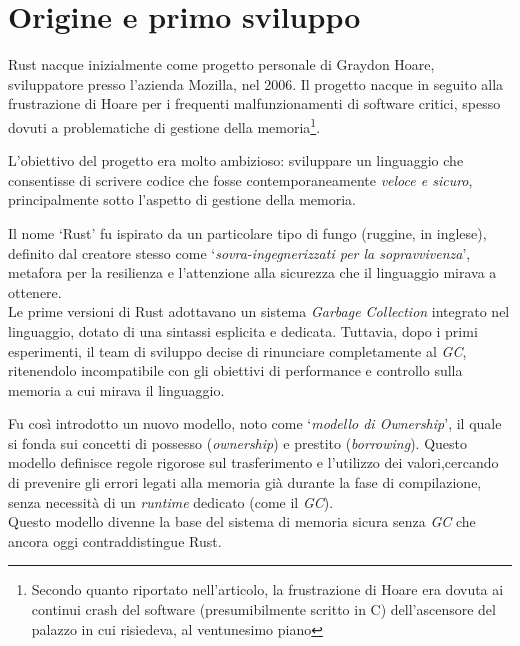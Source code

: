 \section{Origine e primo sviluppo}
Rust nacque inizialmente come progetto personale di Graydon Hoare, sviluppatore presso l'azienda Mozilla, nel 2006.
Il progetto nacque in seguito alla frustrazione di Hoare per i frequenti malfunzionamenti di software critici, spesso dovuti 
a problematiche di gestione della memoria\footnote{Secondo quanto riportato nell'articolo\cite{rust-2023-interview}, 
la frustrazione di Hoare era dovuta ai continui crash del software (presumibilmente scritto in C) dell'ascensore del palazzo in cui risiedeva, al ventunesimo piano}.

L'obiettivo del progetto era molto ambizioso: sviluppare un linguaggio che consentisse di scrivere codice 
che fosse contemporaneamente \textit{veloce e sicuro}, principalmente sotto l'aspetto di gestione della memoria.

Il nome `Rust' fu ispirato da un particolare tipo di fungo (ruggine, in inglese), definito dal creatore 
stesso come `\textit{sovra-ingegnerizzati per la sopravvivenza}', metafora per la resilienza e l'attenzione 
alla sicurezza che il linguaggio mirava a ottenere. \hfill
\vspace{10pt}\\
\noindent Le prime versioni di Rust adottavano un sistema \textit{Garbage Collection} integrato nel linguaggio, dotato di una sintassi esplicita e dedicata.
Tuttavia, dopo i primi esperimenti, il team di sviluppo decise di rinunciare completamente al \textit{GC}, ritenendolo incompatibile con gli obiettivi di performance 
e controllo sulla memoria a cui mirava il linguaggio.

Fu così introdotto un nuovo modello, noto come `\textit{modello di Ownership}', il quale si fonda 
sui concetti di possesso (\textit{ownership}) e prestito (\textit{borrowing}). 
Questo modello definisce regole rigorose sul trasferimento e l'utilizzo dei valori,cercando di prevenire gli errori legati 
alla memoria già durante la fase di compilazione, senza necessità di un \textit{runtime} dedicato (come il \textit{GC}).
\vspace{10pt}\\
\noindent Questo modello divenne la base del sistema di memoria sicura senza \textit{GC} che ancora oggi contraddistingue Rust.

